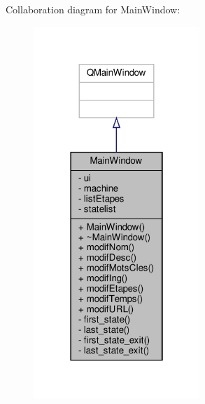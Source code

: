 Collaboration diagram for Main\+Window\+:
\nopagebreak
\begin{figure}[H]
\begin{center}
\leavevmode
\includegraphics[width=178pt]{classMainWindow__coll__graph}
\end{center}
\end{figure}

